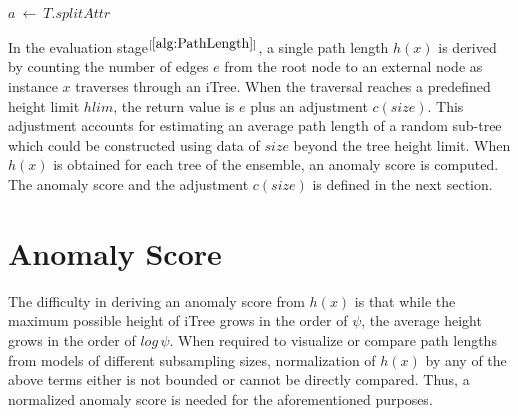 \vspace{1em}
\begin{algorithm}[H]
    \caption{$PathLength(x)$}\label{alg:PathLength}
    \DontPrintSemicolon
    \SetAlgoLined


    $a \: \leftarrow \: T.splitAttr$

\end{algorithm}
\pagebreak

In the evaluation stage$^{[\ref{alg:PathLength}]}$, a single path length $h(x)$ is derived by counting the number of edges $e$ from the root node to an external node as instance $x$ traverses through an iTree.
When the traversal reaches a predefined height limit $hlim$, the return value is $e$ plus an adjustment $c(size)$.
This adjustment accounts for estimating an average path length of a random sub-tree which could be constructed using data of $size$ beyond the tree height limit.
When $h(x)$ is obtained for each tree of the ensemble, an anomaly score is computed.
The anomaly score and the adjustment $c(size)$ is defined in the next section.

\section{Anomaly Score}
\label{sec:iforest-anomaly-score}

The difficulty in deriving an anomaly score from $h(x)$ is that while the maximum possible height of iTree grows in the order of $\psi$, the average height grows in the order of $log\,\psi$.
When required to visualize or compare path lengths from models of different subsampling sizes, normalization of $h(x)$ by any of the above terms either is not bounded or cannot be directly compared.
Thus, a normalized anomaly score is needed for the aforementioned purposes.

